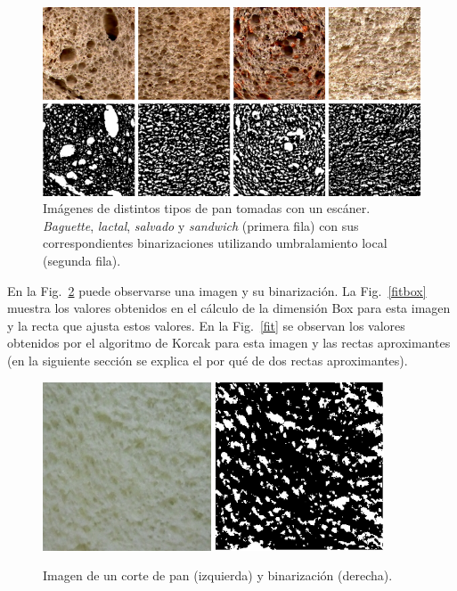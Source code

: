 \begin{figure}[h!]
\centering
\includegraphics[width=13cm]{binarizaciones}
\caption[Imágenes de distintos tipos de pan tomadas con un escáner.]{Imágenes de distintos tipos de pan tomadas con un escáner. {\em Baguette}, {\em lactal}, {\em salvado} y {\em sandwich} (primera fila) con sus correspondientes binarizaciones utilizando umbralamiento local (segunda fila).}
\label{fig:bread}
\end{figure}


En la Fig.~\ref{bin} puede observarse una imagen  y su binarizaci\'on.
La Fig.~\ref{fitbox} muestra los valores obtenidos en el c\'alculo de la dimensi\'on Box para esta imagen y la recta que ajusta estos valores. 
En la Fig.~\ref{fit} se observan los valores obtenidos por el algoritmo de Korcak para esta imagen y las rectas aproximantes (en la siguiente secci\'on se explica el por qu\'e de dos rectas aproximantes).

\begin{figure}
\centering
\includegraphics[width=5cm]{figures/lactal}
\includegraphics[width=5cm]{figures/lactalBin}
\caption{Imagen de un corte de pan (izquierda) y binarización (derecha).}
\label{bin}
\end{figure}



